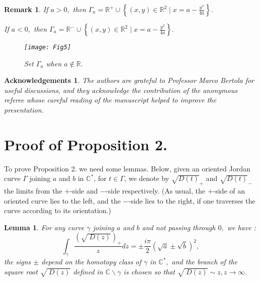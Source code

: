 \documentclass[12pt]{amsart}
\newtheorem{acknowledgement}[theorem]{Acknowledgements}
\newtheorem{lemma}[theorem]{Lemma}
\newtheorem{remark}[theorem]{Remark}
\begin{document}
\begin{remark}
If $a>0,$ then $\Gamma _{a}=\mathbb{R}
^{+}\cup \left\{ \left( x,y\right) \in 
\mathbb{R}
^{2}\mid x=a-\frac{y^{2}}{4a}\right\} .$

If $a<0,$ then $\Gamma _{a}=\mathbb{R}
^{-}\cup \left\{ \left( x,y\right) \in 
\mathbb{R}
^{2}\mid x=a-\frac{y^{2}}{4a}\right\} .$
\begin{figure}[h]
\begin{center}
\texttt{[image: Fig5]}
\caption[le titre]{ Set  $\Gamma_a$  when $a\notin\mathbb{R}.$}
\label{Fig5}
\end{center}
\end{figure}
\end{remark}

\begin{acknowledgement}
\bigskip The authors are grateful to Professor Marco Bertola for useful
discussions, and they acknowledge the contribution of the anonymous referee
whose careful reading of the manuscript helped to improve the presentation.
\end{acknowledgement}

\section{Proof of Proposition 2.}

To prove Proposition 2. we need some lemmas. Below, given an oriented Jordan
curve $\Gamma $ joining $a$ and $b$ in $\mathbb{C}
^{\ast }$, for $t\in \Gamma $, we denote by $\sqrt{D(t)}_{+}$ and $\sqrt{D(t)}_{-}$ the limits from the $+$-side and $-$-side respectively. (As usual,
the $+$-side of an oriented curve lies to the left, and the $-$-side lies to
the right, if one traverses the curve according to its orientation.)

\begin{lemma}
\label{real} For any curve $\gamma $ joining $a$ and $b$ and not passing
through $0,$ we have :\begin{equation*}
\int_{\gamma }\dfrac{\left( \sqrt{\ D\left( z\right) }\right) _{+}}{z}dz=\pm 
\frac{i\pi }{2}\left( \sqrt{a}\pm \sqrt{b}\right) ^{2},
\end{equation*}the signs $\pm $ depend on the homotopy class of $\gamma $ in $\mathbb{C}
^{\ast },$ and the branch of the square root $\sqrt{\ D\left( z\right) }$
defined in $\mathbb{C}
\backslash \gamma $ is chosen so that $\sqrt{\ D\left( z\right) }\sim
z,z\rightarrow \infty .$
\end{lemma}
\end{document}
